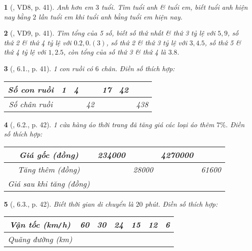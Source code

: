 \documentclass{article}
\newtheorem{baitoan}{}
\begin{document}
\begin{baitoan}[\cite{Binh_boi_duong_Toan_7_tap_1}, VD8, p. 41]
	Anh hơn em $3$ tuổi. Tìm tuổi anh \& tuổi em, biết tuổi anh hiện nay bằng $2$ lần tuổi em khi tuổi anh bằng tuổi em hiện nay.
\end{baitoan}

\begin{baitoan}[\cite{Binh_boi_duong_Toan_7_tap_1}, VD9, p. 41]
	Tìm tổng của 5 số, biết số thứ nhất \& thứ 3 tỷ lệ với $5,9$, số thứ 2 \& thứ 4 tỷ lệ với $0.2,0.(3)$, số thứ 2 \& thứ 3 tỷ lệ với $3,4.5$, số thứ 5 \& thứ 4 tỷ lệ với $1,2.5$, còn tổng của số thứ 3 \& thứ 4 là $3.8$.
\end{baitoan}

\begin{baitoan}[\cite{Binh_boi_duong_Toan_7_tap_1}, 6.1., p. 41]
	1 con ruồi có $6$ chân. Điền số thích hợp:
	\begin{table}[H]
		\centering
		\begin{tabular}{|c|c|c|c|c|c|c|}
			\hline
			Số con ruồi & 1 & 4 &  & 17 & 42 & \\
			\hline
			Số chân ruồi & & & 42 &  &  & 438 \\
			\hline
		\end{tabular}
	\end{table}
\end{baitoan}

\begin{baitoan}[\cite{Binh_boi_duong_Toan_7_tap_1}, 6.2., p. 42]
	1 cửa hàng áo thời trang đã tăng giá các loại áo thêm $7\%$. Điền số thích hợp:
	\begin{table}[H]
		\centering
		\begin{tabular}{|c|c|c|c|c|}
			\hline
			Giá gốc (đồng) & 234000 &  & 4270000 &  \\
			\hline
			Tăng thêm (đồng) &  & 28000 &  & 61600 \\
			\hline
			Giá sau khi tăng (đồng) &  &  &  &  \\
			\hline
		\end{tabular}
	\end{table}
\end{baitoan}

\begin{baitoan}[\cite{Binh_boi_duong_Toan_7_tap_1}, 6.3., p. 42]
	Biết thời gian di chuyển là $20$ phút. Điền số thích hợp:
	\begin{table}[H]
		\centering
		\begin{tabular}{|c|c|c|c|c|c|c|}
			\hline
			Vận tốc (km{\tt/}h) & 60 & 30 & 24 & 15 & 12 & 6 \\
			\hline
			Quãng đường (km) &  &  &  &  &  &  \\
			\hline
		\end{tabular}
	\end{table}
\end{baitoan}
\end{document}
